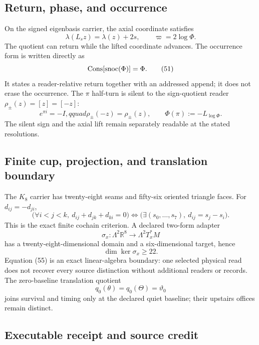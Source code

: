 \subsection{Return, phase, and occurrence}

On the signed eigenbasis carrier, the axial coordinate satisfies
\[
\lambda(L_s z)=\lambda(z)+2s,
\qquad
\varpi=2\log\Phi.
\tag{50}
\]
The quotient can return while the lifted coordinate advances.  The occurrence
form is written directly as
\[
\operatorname{Cons}[\operatorname{snoc}(\Phi)]=\Phi.
\tag{51}
\]
It states a reader-relative return together with an addressed append; it does
not erase the occurrence.  The $\pi$ half-turn is silent to the sign-quotient
reader $\rho_\pm(z)=[z]=[-z]$:
\[
e^{\pi i}=-I,qquad \rho_\pm(-z)=\rho_\pm(z),
\qquad \Phi(\pi):=-L_{\log\Phi}.
\tag{52}
\]
The silent sign and the axial lift remain separately readable at the stated
resolutions.

\subsection{Finite cup, projection, and translation boundary}

The $K_8$ carrier has twenty-eight seams and fifty-six oriented triangle
faces.  For $d_{ij}=-d_{ji}$,
\[
\bigl(\forall i<j<k,\ d_{ij}+d_{jk}+d_{ki}=0\bigr)
\Longleftrightarrow
\bigl(\exists(s_0,\ldots,s_7),\ d_{ij}=s_j-s_i\bigr).
\tag{53}
\]
This is the exact finite cochain criterion.  A declared two-form adapter
\[
\sigma_x:\Lambda^2\mathbb R^8\longrightarrow\Lambda^2T_x^*M
\tag{54}
\]
has a twenty-eight-dimensional domain and a six-dimensional target, hence
\[
\dim\ker\sigma_x\ge22.
\tag{55}
\]
Equation (55) is an exact linear-algebra boundary: one selected physical read
does not recover every source distinction without additional readers or
records.  The zero-baseline translation quotient
\[
q_0(\theta)=q_0(\Theta)=\vartheta_0
\tag{56}
\]
joins survival and timing only at the declared quiet baseline; their upstairs
offices remain distinct.

\subsection{Executable receipt and source credit}

